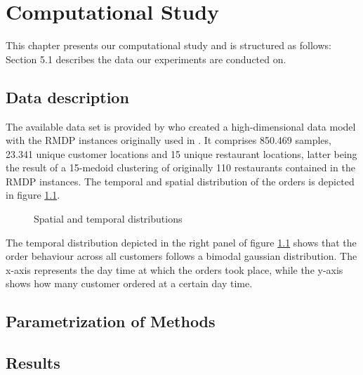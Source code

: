 \chapter{Computational Study}

This chapter presents our computational study and is structured as follows: Section 5.1 describes the data our experiments are conducted on.  
\section{Data description}

The available data set is provided by \cite{Hildebrandt2020_EAT} who created a high-dimensional data model with the RMDP instances originally used in \cite{UlmerRMDP}. It comprises 850.469 samples, 23.341 unique customer locations and 15 unique restaurant locations, latter being the result of a 15-medoid clustering of originally 110 restaurants contained in the RMDP instances. The temporal and spatial distribution of the orders is depicted in figure \ref{fig:dists}. 
\begin{figure}[h]
	\centering
	\caption{Spatial and temporal distributions}
	\label{fig:dists}
\end{figure}

The temporal distribution depicted in the right panel of figure \ref{fig:dists} shows that the order behaviour across all customers follows a bimodal gaussian distribution. The x-axis represents the day time at which the orders took place, while the y-axis shows how many customer ordered at a certain day time.
 
\section{Parametrization of Methods}

\section{Results}







